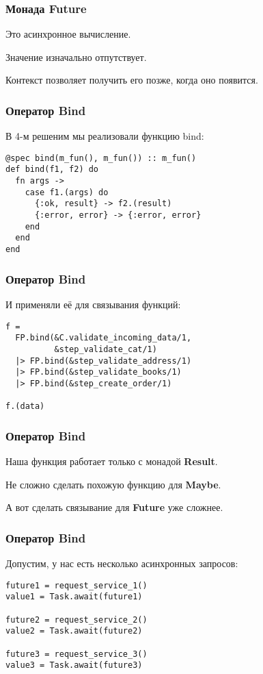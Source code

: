 \documentclass[10pt]{beamer}
\begin{document}
\begin{frame}
  \frametitle{Монада Future}
  Это асинхронное вычисление.
  \par \bigskip
  Значение изначально отпутствует.
  \par \bigskip
  Контекст позволяет получить его позже, когда оно появится.
\end{frame}

\begin{frame}[fragile]
  \frametitle{Оператор Bind}
  В 4-м решеним мы реализовали функцию bind:
  \par \bigskip
  \begin{lstlisting}
@spec bind(m_fun(), m_fun()) :: m_fun()
def bind(f1, f2) do
  fn args ->
    case f1.(args) do
      {:ok, result} -> f2.(result)
      {:error, error} -> {:error, error}
    end
  end
end
  \end{lstlisting}
\end{frame}

\begin{frame}[fragile]
  \frametitle{Оператор Bind}
  И применяли её для связывания функций:
  \par \bigskip
  \begin{lstlisting}
f =
  FP.bind(&C.validate_incoming_data/1,
          &step_validate_cat/1)
  |> FP.bind(&step_validate_address/1)
  |> FP.bind(&step_validate_books/1)
  |> FP.bind(&step_create_order/1)

f.(data)
  \end{lstlisting}
\end{frame}

\begin{frame}
  \frametitle{Оператор Bind}
  Наша функция работает только с монадой \textbf{Result}.
  \par \bigskip
  Не сложно сделать похожую функцию для \textbf{Maybe}.
  \par \bigskip
  А вот сделать связывание для \textbf{Future} уже сложнее.
\end{frame}

\begin{frame}[fragile]
  \frametitle{Оператор Bind}
  Допустим, у нас есть несколько асинхронных запросов:
  \par \bigskip
  \begin{lstlisting}
future1 = request_service_1()
value1 = Task.await(future1)

future2 = request_service_2()
value2 = Task.await(future2)

future3 = request_service_3()
value3 = Task.await(future3)
  \end{lstlisting}
\end{frame}
\end{document}
